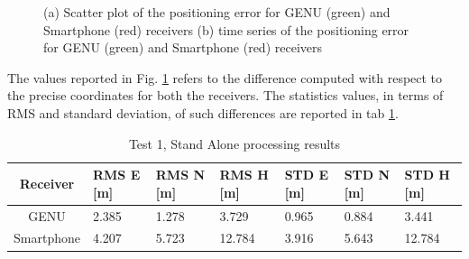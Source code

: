 \begin{figure}[H] 
	\centering
    \caption{(a) Scatter plot of the positioning error for GENU (green) and Smartphone (red) receivers  (b) time series of the positioning error for GENU (green) and Smartphone (red) receivers}
	\label{FIG:test1_standalone} 
\end{figure}

The values reported in Fig. \ref{FIG:test1_standalone} refers to the difference computed with respect to the precise coordinates for both the receivers. 
The statistics values, in terms of RMS and standard deviation, of such differences are reported in tab \ref{tab:test1_spp}.

\begin{table}[H]
	\centering
	\begin{tabular}{|c|p{1.5cm}|p{1.5cm}|p{1.5cm}|p{1.5cm}|p{1.5cm}|p{1.5cm}|}
	\hline
	\textbf{Receiver} & \textbf{RMS E [m]} & \textbf{RMS N [m]} &
	\textbf{RMS H [m]} &\textbf{STD E [m]}&\textbf{STD N [m]}&\textbf{STD H [m]}\\
    \hline
	GENU & 2.385 & 1.278& 3.729&0.965&0.884&3.441\\  
    \hline
	Smartphone & 4.207 & 5.723& 12.784&3.916&5.643&12.784\\ \hline
	\end{tabular} 
	\caption{Test 1, Stand Alone processing results}
	\label{tab:test1_spp}
\end{table}

